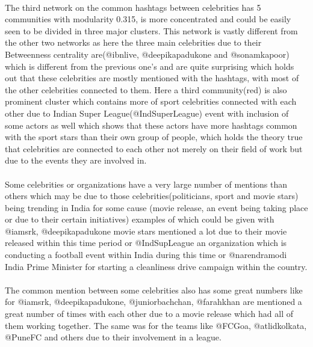 \documentclass[runningheads,a4paper]{llncs}
\begin{document}
\paragraph{}
The third network on the common hashtags between celebrities has 5 communities with modularity 0.315, is more concentrated and could be easily seen to be divided in three major clusters. This network is vastly different from the other two networks as here the three main celebrities due to their Betweenness centrality are(@ibnlive, @deepikapadukone and @sonamkapoor) which is different from the previous one's and are quite surprising which holds out that these celebrities are mostly mentioned with the hashtags, with most of the other celebrities connected to them. Here a third community(red) is also prominent cluster which contains more of sport celebrities connected with each other due to Indian Super League(@IndSuperLeague) event with inclusion of some actors as well which shows that these actors have more hashtags common with the sport stars than their own group of people, which holds the theory true that celebrities are connected to each other not merely on their field of work but due to the events they are involved in.

\paragraph{}
Some celebrities or organizations have a very large number of mentions than others which may be due to those celebrities(politicians, sport and movie stars) being trending in India for some cause (movie release, an event being taking place or due to their certain initiatives) examples of which could be given with @iamsrk, @deepikapadukone movie stars mentioned a lot due to their movie released within this time period or @IndSupLeague an organization which is conducting a football event within India during this time or @narendramodi India Prime Minister for starting a cleanliness drive campaign within the country.

\paragraph{}
The common mention between some celebrities also has some great numbers like for @iamsrk, @deepikapadukone, @juniorbachchan, @farahkhan are mentioned a great number of times with each other due to a movie release which had all of them working together. The same was for the teams like @FCGoa, @atlidkolkata, @PuneFC and others due to their involvement in a league.
\end{document}
